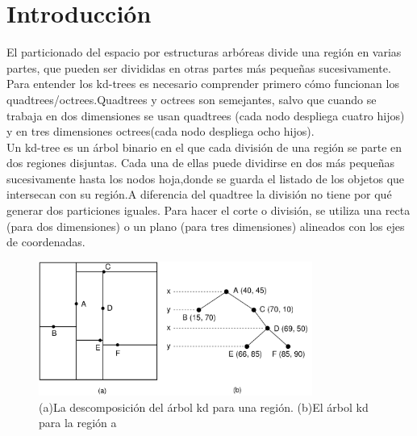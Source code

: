 \section{Introducción}

El  particionado  del  espacio  por  estructuras  arbóreas  divide  una  región  en  varias  partes, que pueden ser divididas en otras partes más pequeñas sucesivamente. Para entender los kd-trees es necesario comprender primero cómo funcionan los quadtrees/octrees.Quadtrees y octrees son semejantes, salvo que cuando se trabaja en dos dimensiones se usan quadtrees (cada nodo despliega cuatro hijos) y en tres dimensiones octrees(cada nodo despliega ocho hijos). \\

Un  kd-tree  es un  árbol  binario  en  el  que  cada  división  de  una  región se  parte  en dos regiones disjuntas. Cada una de ellas puede dividirse en dos más pequeñas sucesivamente hasta los  nodos  hoja,donde se  guarda  el  listado  de  los  objetos  que intersecan  con su  región.A diferencia del quadtree la división no tiene por qué generar dos particiones iguales. Para hacer el corte  o  división,  se  utiliza una  recta  (para  dos  dimensiones)  o  un  plano  (para  tres  dimensiones) alineados con los ejes de coordenadas.

\begin{figure}[H]
  \centering
  \includegraphics[width=0.8\textwidth]{images/KDtree.png}
  \caption{(a)La descomposición del árbol kd para una región. (b)El árbol kd para la región a}
  \label{fig:act-kdtree}
\end{figure}